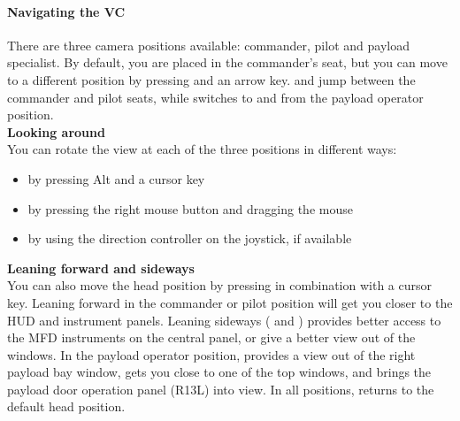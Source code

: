 \documentclass[Orbiter User Manual.tex]{subfiles}
\begin{document}
\paragraph{Navigating the VC}
There are three camera positions available: commander, pilot and payload specialist. By default, you are placed in the commander's seat, but you can move to a different position by pressing  and an arrow key.  \keystroke{$\rightarrow$} and \keystroke{$\leftarrow$} jump between the commander and pilot seats, while \keystroke{$\downarrow$} switches to and from the payload operator position.\\

\noindent
\textbf{Looking around}\\

\noindent You can rotate the view at each of the three positions in different ways:
\begin{itemize}
\item by pressing Alt and a cursor key
\item by pressing the right mouse button and dragging the mouse
\item by using the direction controller on the joystick, if available 
\end{itemize}
\vspace{0.5cm}
\noindent
\textbf{Leaning forward and sideways}\\

\noindent
You can also move the head position by pressing  in combination with a cursor key. Leaning forward \keystroke{$\uparrow$} in the commander or pilot position will get you closer to the HUD and instrument panels. Leaning sideways (\keystroke{$\rightarrow$} and \keystroke{$\leftarrow$}) provides better access to the MFD instruments on the central panel, or give a better view out of the windows.
In the payload operator position, \keystroke{$\rightarrow$} provides a view out of the right payload bay window, \keystroke{$\uparrow$} gets you close to one of the top windows, and \keystroke{$\leftarrow$} brings the payload door operation panel (R13L) into view.
In all positions, \keystroke{$\downarrow$} returns to the default head position.
\end{document}
